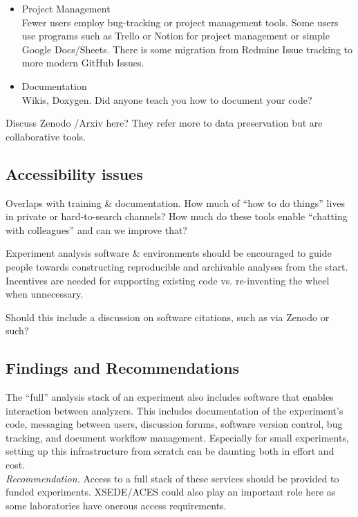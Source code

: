 \begin{itemize}
  \item Project Management\\
Fewer users employ bug-tracking or project management tools. 
Some users use programs such as Trello or Notion for project management or simple Google Docs/Sheets. There is some migration from Redmine Issue tracking to more modern GitHub Issues.
  \item Documentation\\
Wikis, Doxygen. Did anyone teach you how to document your code?


\end{itemize}

Discuss Zenodo /Arxiv here? They refer more to data preservation but are collaborative tools.

\subsection{Accessibility issues}
Overlaps with training \& documentation.
How much of “how to do things” lives in private or hard-to-search channels?
How much do these tools enable “chatting with colleagues” and can we improve that?


Experiment analysis software \& environments should be encouraged to guide people towards constructing reproducible and archivable analyses from the start.
Incentives are needed for supporting existing code vs. re-inventing the wheel when unnecessary.

\begin{comment}
Tools for collaboration
git
Many people love git
Some people feel that more git training is needed
\end{comment}


Should this include a discussion on software citations, such as via Zenodo or such?

\subsection{Findings and Recommendations}
The “full” analysis stack of an experiment also includes software that enables interaction between analyzers. This includes documentation of the experiment’s code, messaging between users, discussion forums, software version control, bug tracking, and document workflow management. Especially for small experiments, setting up this infrastructure from scratch can be daunting both in effort and cost.\\
\textit{Recommendation.} Access to a full stack of these services should be provided to funded experiments.  XSEDE/ACES could also play an important role here as some laboratories have onerous access requirements.

